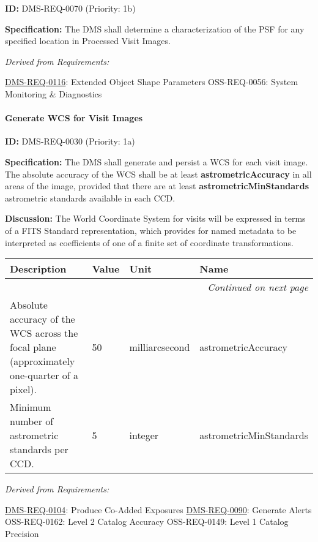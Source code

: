 \documentclass[SE,toc,lsstdraft]{lsstdoc}
\makeatletter
\newcommand{\paramname}[1]{\hspace{0pt}#1}
\newcommand{\unitname}[1]{\hspace{0pt}#1}
\newenvironment{parameters}[0]{%
\setlength\LTleft{0pt}
\setlength\LTright{\fill}
\begin{small}
\begin{longtable}[]{|p{0.49\textwidth}|l|p{0.6in}|p{1.70in}@{}|}

\hline \textbf{Description} & \textbf{Value} & \textbf{Unit} & \textbf{Name} \\ \hline
\endhead

\hline \multicolumn{4}{r}{\emph{Continued on next page}} \\
\endfoot

\hline\hline
\endlastfoot
}{%
\hline
\end{longtable}
\end{small}
}
\makeatother
\begin{document}
\label{DMS-REQ-0070}
\textbf{ID:} DMS-REQ-0070 (Priority: 1b)

\textbf{Specification:} The DMS shall determine a characterization of the PSF for any specified location in Processed Visit Images.

\emph{Derived from Requirements:}

\hyperref[DMS-REQ-0116]{DMS-REQ-0116}:
Extended Object Shape Parameters \newline
OSS-REQ-0056:
System Monitoring \& Diagnostics \newline

\paragraph{Generate WCS for Visit Images}\hfill  %

\label{DMS-REQ-0030}
\textbf{ID:} DMS-REQ-0030 (Priority: 1a)

\textbf{Specification:} The DMS shall generate and persist a WCS for each visit image.  The absolute accuracy of the WCS shall be at least \textbf{astrometricAccuracy} in all areas of the image, provided that there are at least \textbf{astrometricMinStandards} astrometric standards available in each CCD.

\textbf{Discussion:} The World Coordinate System for visits will be expressed in terms of a FITS Standard representation, which provides for named metadata to be interpreted as coefficients of one of a finite set of coordinate transformations.

\begin{parameters}
Absolute accuracy of the WCS across the focal plane (approximately one-quarter of a pixel).
&
50
&
\unitname{%
milliarcsecond
}
&
\paramname{%
astrometricAccuracy
} \\\hline
Minimum number of astrometric standards per CCD.
&
5
&
\unitname{%
integer
}
&
\paramname{%
astrometricMinStandards
} \\\hline
\end{parameters}

\emph{Derived from Requirements:}

\hyperref[DMS-REQ-0104]{DMS-REQ-0104}:
Produce Co-Added Exposures \newline
\hyperref[DMS-REQ-0090]{DMS-REQ-0090}:
Generate Alerts \newline
OSS-REQ-0162:
Level 2 Catalog Accuracy \newline
OSS-REQ-0149:
Level 1 Catalog Precision \newline
\end{document}
